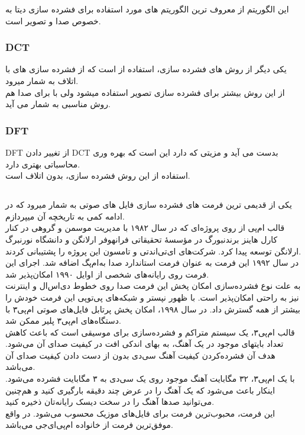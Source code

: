 این الگوریتم از معروف ترین الگوریتم های مورد استفاده برای فشرده سازی دیتا به خصوص صدا و تصویر است.

\subsubsection{DCT}
یکی دیگر از روش های فشرده سازی، استفاده از 
است که از فشرده سازی های با اتلاف به شمار میرود.
\\
از این روش بیشتر برای فشرده سازی تصویر استفاده میشود ولی با برای صدا هم روش مناسبی به شمار می آید.

\subsubsection{DFT}
DFT 
از تغییر دادن 
DCT 
بدست می آید و مزیتی که دارد این است که بهره وری محاسباتی بهتری دارد.
\\
استفاده از این روش فشرده سازی، بدون اتلاف است.

\subsection{}
یکی از قدیمی ترین فرمت های فشرده سازی فایل های صوتی به شمار میرود که در ادامه کمی به تاریخچه آن میپردازم.
\\
قالب ام‌پی از روی پروژه‌ای که در سال ۱۹۸۲ با مدیریت موسمن و گروهی در کنار کارل هاینز برندنبورگ در مؤسسهٔ تحقیقاتی فرانهوفر ارلانگن و دانشگاه نورنبرگ ارلانگن توسعه پیدا کرد. شرکت‌های ای‌تی‌اندتی و تامسون این پروژه را پشتیبانی کردند.
\\
در سال ۱۹۹۲ این فرمت به عنوان فرمت استاندارد صدا به‌ام‌پگ اضافه شد. اجرای این فرمت روی رایانه‌های شخصی از اوایل ۱۹۹۰ امکان‌پذیر شد.
\\
به علت نوع فشرده‌سازی امکان پخش این فرمت صدا روی خطوط دی‌اس‌ال و اینترنت نیز به راحتی امکان‌پذیر است. با ظهور نپستر و شبکه‌های پی‌توپی این فرمت خودش را بیشتر از همه گسترش داد. در سال ۱۹۹۸، امکان پخش پرتابل فایل‌های صوتی ام‌پی۳ با دستگاه‌های ام‌پی۳ پلیر ممکن شد.
\\
قالب ام‌پی۳، یک سیستم متراکم و فشرده‌سازی برای موسیقی است که باعث کاهش تعداد بایتهای موجود در یک آهنگ، به بهای اندکی افت در کیفیت صدای آن می‌شود. هدف آن فشرده‌کردن کیفیت آهنگ سی‌دی بدون از دست دادن کیفیت صدای آن می‌باشد.
\\
با یک ام‌پی۳، ۳۲ مگابایت آهنگ موجود روی یک سی‌دی به ۳ مگابایت فشرده می‌شود. اینکار باعث می‌شود که یک آهنگ را در عرض چند دقیقه بارگیری کنید و هم‌چنین می‌توانید صدها آهنگ را در سخت دیسک رایانه‌تان ذخیره کنید.
\\
این فرمت، محبوب‌ترین فرمت برای فایل‌های موزیک محسوب می‌شود. 
در واقع 
موفق‌ترین فرمت از خانواده ام‌پی‌ای‌جی می‌باشد.

